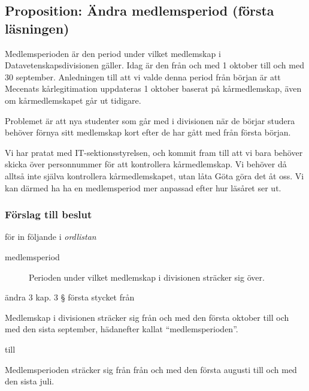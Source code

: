 \documentclass[protokoll]{dvd}
\begin{document}
\newpage
\subsection{Proposition: Ändra medlemsperiod (första läsningen)}

Medlemsperioden är den period under vilket medlemskap i Datavetenskapsdivisionen gäller.
Idag är den från och med 1 oktober till och med 30 september.
Anledningen till att vi valde denna period från början är att Mecenats kårlegitimation uppdateras 1 oktober baserat på kårmedlemskap, även om kårmedlemskapet går ut tidigare.

Problemet är att nya studenter som går med i divisionen när de börjar studera behöver förnya sitt medlemskap kort efter de har gått med från första början.

Vi har pratat med IT-sektionsstyrelsen, och kommit fram till att vi bara behöver skicka över personnummer för att kontrollera kårmedlemskap.
Vi behöver då alltså inte själva kontrollera kårmedlemskapet, utan låta Göta göra det åt oss.
Vi kan därmed ha ha en medlemsperiod mer anpassad efter hur läsåret ser ut.

\subsubsection*{Förslag till beslut}

\begin{attsatser}
	\item för in följande i \emph{ordlistan}

	\begin{displayquote}
		\begin{description}
			\item[medlemsperiod] Perioden under vilket medlemskap i divisionen sträcker sig över.
		\end{description}
	\end{displayquote}

	\item ändra 3 kap. 3 § första stycket från

	\begin{displayquote}
		Medlemskap i divisionen sträcker sig från och med den första oktober till och med den sista september, hädanefter kallat ``medlemsperioden''.
	\end{displayquote}

	till

	\begin{displayquote}
		Medlemsperioden sträcker sig från från och med den första augusti till och med den sista juli.
	\end{displayquote}
\end{attsatser}
\end{document}
